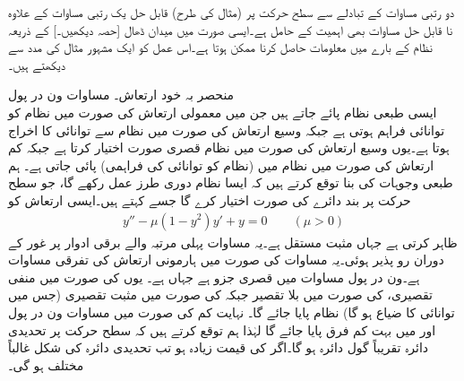 دو رتبی مساوات کے تبادلے سے سطح حرکت پر (مثال  کی طرح) قابل حل یک رتبی مساوات کے علاوہ نا قابل حل مساوات بھی اہمیت کے حامل ہے۔ایسی صورت میں میدان ڈھال [حصہ  دیکھیں۔] کے ذریعہ نظام کے بارے میں معلومات حاصل کرنا ممکن ہوتا ہے۔اس عمل کو ایک مشہور مثال کی مدد سے دیکھتے ہیں۔

\quad منحصر بہ خود ارتعاش۔ مساوات ون در پول\\
ایسی طبعی نظام پائے جاتے ہیں جن میں معمولی ارتعاش کی صورت میں نظام کو توانائی فراہم ہوتی ہے جبکہ وسیع ارتعاش کی صورت میں نظام سے توانائی کا اخراج ہوتا ہے۔یوں وسیع ارتعاش کی صورت میں نظام قصری صورت اختیار کرتا ہے جبکہ کم ارتعاش کی صورت میں نظام میں  (نظام کو توانائی کی فراہمی) پائی جاتی ہے۔ ہم طبعی وجوہات کی بنا توقع کرتے ہیں کہ ایسا نظام دوری طرز عمل رکھے گا، جو سطح حرکت پر بند دائرے کی صورت اختیار کرے گا جسے   کہتے ہیں۔ایسی ارتعاش کو  
\begin{align}\label{مساوات_نظام_ون_در_پول}
y''-\mu(1-y^2)y'+y=0\quad \quad (\mu >0)
\end{align}
ظاہر کرتی ہے جہاں  مثبت مستقل ہے۔یہ مساوات پہلی مرتبہ  والے برقی ادوار پر غور کے دوران رو پذیر ہوئی۔یہ مساوات  کی صورت میں ہارمونی ارتعاش کی تفرقی مساوات  ہے۔ون در پول مساوات میں قصری جزو  ہے جہاں  ہے۔ یوں  کی صورت میں منفی تقصیری،  کی صورت میں بلا تقصیر جبکہ  کی صورت میں مثبت تقصیری (جس میں توانائی کا ضیاع ہو گا) نظام پایا جائے گا۔ نہایت کم  کی صورت میں مساوات ون در پول اور  میں بہت کم فرق پایا جائے گا لہٰذا ہم توقع کرتے ہیں کہ سطح حرکت پر تحدیدی دائرہ تقریباً گول دائرہ ہو گا۔اگر  کی قیمت زیادہ ہو تب تحدیدی دائرہ کی شکل غالباً مختلف ہو گی۔

